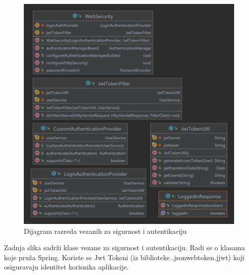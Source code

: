         		\begin{figure}[H]
                    \includegraphics[scale=0.25]{slike/security.png}
        			\centering
        			\caption{Dijagram razreda vezanih za sigurnost i autentikaciju}
        			\label{fig:hztm-stranica}
        		\end{figure}
			
			Zadnja slika sadrži klase vezane za sigurnost i autentikaciju. Radi se o klasama koje pruža Spring. Koriste se Jwt Tokeni (iz biblioteke .jsonwebtoken.jjwt) koji osiguravaju identitet korisnika aplikacije.
			
			
			
			
		    
		
		
			
			
			
